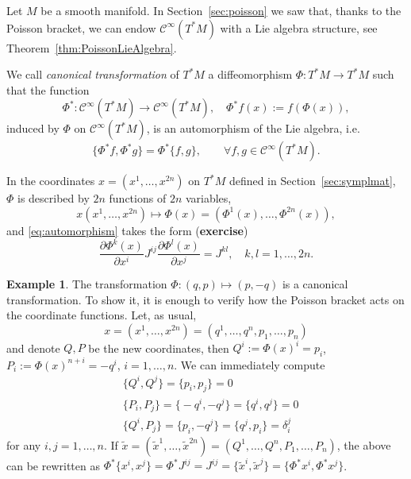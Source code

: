 \documentclass[english,fontsize=11pt,paper=b5]{scrbook}
\numberwithin{equation}{chapter}
\theoremstyle{definition}
\newtheorem{example}{Example}[chapter]
\begin{document}
    Let $M$ be a smooth manifold. In Section~\ref{sec:poisson} we saw that, thanks to the Poisson bracket, we can endow $\mathcal{C}^\infty(T^*M)$ with a Lie algebra structure, see Theorem~\ref{thm:PoissonLieAlgebra}.

    \begin{tcolorbox}
      We call \emph{canonical transformation} of $T^*M$ a diffeomorphism $\Phi: T^*M\to T^*M$ such that the function
      \begin{equation}
        \Phi^*: \mathcal{C}^\infty(T^*M) \to \mathcal{C}^\infty(T^*M),\quad
        \Phi^* f(x) := f(\Phi(x)),
      \end{equation}
      induced by $\Phi$ on $\mathcal{C}^\infty(T^*M)$, is an automorphism of the Lie algebra, i.e.
      \begin{equation}\label{eq:automorphism}
        \big\{\Phi^* f, \Phi^* g\big\} = \Phi^*\big\{f,g\big\}, \qquad\forall f,g\in\mathcal{C}^\infty(T^*M).
      \end{equation}
    \end{tcolorbox}

    In the coordinates $x=(x^1, \ldots, x^{2n})$ on $T^*M$ defined in Section~\ref{sec:symplmat}, $\Phi$ is described by $2n$ functions of $2n$ variables,
    \begin{equation}
      x(x^1,\ldots,x^{2n}) \mapsto \Phi(x) = \left(\Phi^1(x), \ldots, \Phi^{2n}(x)\right),
    \end{equation}
    and \eqref{eq:automorphism} takes the form (\textbf{exercise})
    \begin{equation}\label{eq:cantrafocoord}
      \frac{\partial\Phi^k(x)}{\partial x^i} J^{ij} \frac{\partial\Phi^l(x)}{\partial x^j} = J^{kl},\quad k,l=1,\ldots,2n.
    \end{equation}

    \begin{example}
      The transformation $\Phi: (q,p) \mapsto (p, -q)$ is a canonical transformation.
      To show it, it is enough to verify how the Poisson bracket acts on the coordinate functions. Let, as usual, \begin{equation}
        x=(x^1, \ldots,x^{2n})=(q^1,\ldots,q^n,p_1,\ldots,p_n)
      \end{equation}
      and denote $Q,P$ be the new coordinates, then $Q^i := \Phi(x)^i = p_i$, $P_i := \Phi(x)^{n+i} = -q^i$, $i=1,\ldots, n$.
      We can immediately compute
      \begin{align}
     & \big\{Q^i, Q^j\big\} = \big\{p_i, p_j\big\} = 0                                  \\
     & \big\{P_i, P_j\big\} = \big\{-q^i, -q^j\big\} = \big\{q^i, q^j\big\} = 0         \\
     & \big\{Q^i, P_j\big\} = \big\{p_i, -q^j\big\} = \big\{q^j, p_i\big\} = \delta^j_i
      \end{align}
      for any $i,j=1,\ldots,n$.
      If $\widetilde x = (\widetilde x^1, \ldots, \widetilde x^{2n})= (Q^1, \ldots, Q^n, P_1,\ldots,P_n)$, the above can be rewritten as $\Phi^*\big\{x^i, x^j\big\} = \Phi^* J^{ij} = J^{ij} = \big\{\widetilde x^i, \widetilde x^j\big\} = \big\{\Phi^* x^i, \Phi^* x^j\big\}$.
    \end{example}
\end{document}

